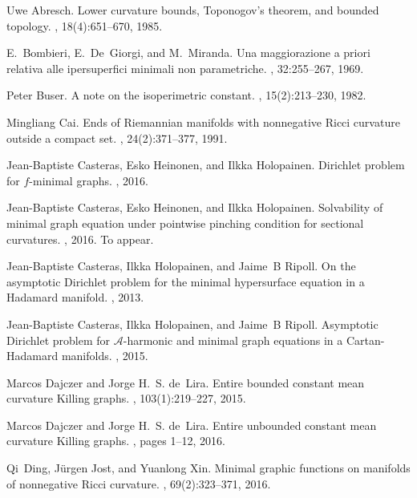 \documentclass[10pt,a4paper,reqno]{amsart}
\numberwithin{equation}{section}
\theoremstyle{plain}
\theoremstyle{definition}
\begin{document}

\begin{thebibliography}{10}

Uwe Abresch.
\newblock Lower curvature bounds, {T}oponogov's theorem, and bounded topology.
, 18(4):651--670, 1985.

E.~Bombieri, E.~De~Giorgi, and M.~Miranda.
\newblock Una maggiorazione a priori relativa alle ipersuperfici minimali non
  parametriche.
, 32:255--267, 1969.

Peter Buser.
\newblock A note on the isoperimetric constant.
, 15(2):213--230, 1982.

Mingliang Cai.
\newblock Ends of {R}iemannian manifolds with nonnegative {R}icci curvature
  outside a compact set.
, 24(2):371--377, 1991.

Jean-Baptiste Casteras, Esko Heinonen, and Ilkka Holopainen.
\newblock Dirichlet problem for $f$-minimal graphs.
, 2016.

Jean-Baptiste Casteras, Esko Heinonen, and Ilkka Holopainen.
\newblock Solvability of minimal graph equation under pointwise pinching
  condition for sectional curvatures.
, 2016.
\newblock To appear.

Jean-Baptiste Casteras, Ilkka Holopainen, and Jaime~B Ripoll.
\newblock On the asymptotic {D}irichlet problem for the minimal hypersurface
  equation in a {H}adamard manifold.
, 2013.

Jean-Baptiste Casteras, Ilkka Holopainen, and Jaime~B Ripoll.
\newblock Asymptotic {D}irichlet problem for {${\mathcal A}$}-harmonic and
  minimal graph equations in a {C}artan-{H}adamard manifolds.
, 2015.

Marcos Dajczer and Jorge H.~S. de~Lira.
\newblock Entire bounded constant mean curvature {K}illing graphs.
, 103(1):219--227, 2015.

Marcos Dajczer and Jorge H.~S. de~Lira.
\newblock Entire unbounded constant mean curvature {K}illing graphs.
, pages 1--12, 2016.

Qi~Ding, J{\"u}rgen Jost, and Yuanlong Xin.
\newblock Minimal graphic functions on manifolds of nonnegative {R}icci
  curvature.
, 69(2):323--371, 2016.


\end{thebibliography}
\end{document}
